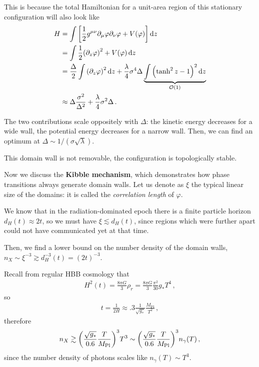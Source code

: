 \documentclass[main.tex]{subfiles}
\begin{document}
This is because the total Hamiltonian for a unit-area region of this stationary configuration will also look like 
%
\begin{align}
H &= \int \qty[\frac{1}{2} g^{\mu \nu } \partial_{\mu } \varphi \partial_{\nu } \varphi + V(\varphi ) ] \dd{z}  \\
&= \int \frac{1}{2} \qty(\partial_{z} \varphi )^2 + V(\varphi ) \dd{z}  \\
&= \frac{\Delta}{2} \int \qty(\partial_{z} \varphi)^2 \dd{z} + \frac{\lambda}{4} \sigma^4 \Delta  \underbrace{\int \qty(\tanh^2 z - 1)^2 \dd{z}}_{\order{1}}   \\
&\approx \Delta \frac{\sigma^2}{\Delta^2} + \frac{\lambda}{4} \sigma^2 \Delta 
\,.
\end{align}


The two contributions scale oppositely with \(\Delta \): the kinetic energy decreases for a wide wall, the potential energy decreases for a narrow wall. 
Then, we can find an optimum at \(\Delta \sim 1 / (\sigma \sqrt{\lambda })\). 

This domain wall is not removable, the configuration is topologically stable. 

Now we discuss the \textbf{Kibble mechanism}, which demonstrates how phase transitions always generate domain walls. 
Let us denote as \(\xi \) the typical linear size of the domains: it is called the \emph{correlation length} of \(\varphi \). 

We know that in the radiation-dominated epoch there is a finite particle horizon \(d_H(t) \approx 2 t\), so we must have \(\xi \lesssim d_H (t)\), since regions which were further apart could not have communicated yet at that time. 

Then, we find a lower bound on the number density of the domain walls, \(n_X \sim \xi^{-3} \gtrsim d_H^{-3}(t) = (2t)^{-3}\). 

Recall from regular HBB cosmology that 
%
\begin{align}
H^2(t) = \frac{8 \pi G}{3} \rho _r = \frac{8 \pi G}{3} \frac{\pi^2}{30} g_* T^{4}
\,,
\end{align}
%
so 
%
\begin{align}
t = \frac{1}{2 H} \approx \num{.3} \frac{1}{\sqrt{g_*}} \frac{M _{\text{Pl}}}{T^2}
\,,
\end{align}
%
therefore 
%
\begin{align}
n_X \gtrsim \qty(\frac{\sqrt{g_*}}{\num{.6}} \frac{T}{M _{\text{Pl}}})^3 T^3 \sim \qty(\frac{\sqrt{g_*}}{\num{.6}} \frac{T}{ M _{\text{Pl}}})^3 n_\gamma (T)
\,,
\end{align}
%
since the number density of photons scales like \(n_\gamma (T) \sim T^3\).
\end{document}
